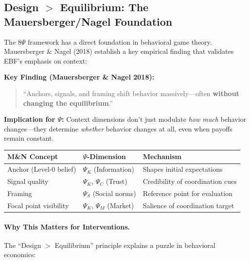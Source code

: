 \subsection{Design $>$ Equilibrium: The Mauersberger/Nagel Foundation}
\label{sec:V-design-equilibrium}

The 8$\Psi$ framework has a direct foundation in behavioral game theory.
Mauersberger \& Nagel (2018) establish a key empirical finding that validates
EBF's emphasis on context:

\begin{tcolorbox}[colback=yellow!5!white, colframe=yellow!75!black,
    title=\textbf{Design $>$ Equilibrium: Context Shifts Behavior Without Changing Payoffs}]

\textbf{Key Finding (Mauersberger \& Nagel 2018):}
\begin{quote}
``Anchors, signals, and framing shift behavior massively---often \textbf{without changing
the equilibrium}.''
\end{quote}

\textbf{Implication for $\Psi$:}
Context dimensions don't just modulate \textit{how much} behavior changes---they determine
\textit{whether} behavior changes at all, even when payoffs remain constant.

\begin{center}
\renewcommand{\arraystretch}{1.2}
\begin{tabular}{@{}p{3.5cm}p{4.5cm}p{4.5cm}@{}}
\toprule
\textbf{M\&N Concept} & \textbf{$\Psi$-Dimension} & \textbf{Mechanism} \\
\midrule
Anchor (Level-0 belief) & $\Psi_K$ (Information) & Shapes initial expectations \\
Signal quality & $\Psi_K$, $\Psi_C$ (Trust) & Credibility of coordination cues \\
Framing & $\Psi_S$ (Social norms) & Reference point for evaluation \\
Focal point visibility & $\Psi_K$, $\Psi_M$ (Market) & Salience of coordination target \\
\bottomrule
\end{tabular}
\end{center}

\end{tcolorbox}

\paragraph{Why This Matters for Interventions.}
The ``Design $>$ Equilibrium'' principle explains a puzzle in behavioral economics:

